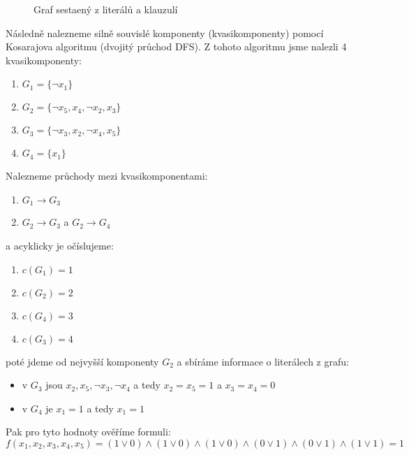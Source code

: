 \documentclass[10pt, a4paper]{ReportSheet}
\begin{document}
\begin{uloha}{12}{2}
\begin{figure}[H]
\begin{tikzpicture}[->,>=stealth',shorten >=1pt,auto,node distance=5cm,semithick]
            \end{tikzpicture}
            \caption{Graf sestaený z literálů a klauzulí}
            \label{fig:ukol-2-12-graf}
        \end{figure}

        Následně nalezneme silně souvislé komponenty (kvasikomponenty) pomocí Kosarajova algoritmu (dvojitý průchod DFS). Z tohoto algoritmu jsme nalezli 4 kvasikomponenty:
        \begin{enumerate}
            \item $G_1 = \{ \neg x_1 \}$
            \item $G_2 = \{ \neg x_5, x_4, \neg x_2, x_3 \}$
            \item $G_3 = \{ \neg x_3, x_2, \neg x_4, x_5 \}$
            \item $G_4 = \{ x_1 \}$
        \end{enumerate}

        Nalezneme průchody mezi kvasikomponentami:
        \begin{enumerate}
            \item $G_1 \rightarrow G_3$
            \item $G_2 \rightarrow G_3$ a $G_2 \rightarrow G_4$
        \end{enumerate}
        a acyklicky je očíslujeme:
        \begin{enumerate}
            \item $c(G_1) = 1$
            \item $c(G_2) = 2$
            \item $c(G_4) = 3$
            \item $c(G_3) = 4$
        \end{enumerate}
        poté jdeme od nejvyšší komponenty $G_2$ a sbíráme informace o literálech z grafu:
        \begin{itemize}
            \item v $G_3$ jsou $x_2, x_5, \neg x_3, \neg x_4$ a tedy $x_2 = x_5 = 1$ a $x_3 = x_4 = 0$
            \item v $G_4$ je $x_1 = 1$ a tedy $x_1 = 1$
        \end{itemize}

        Pak pro tyto hodnoty ověříme formuli:
        \begin{equation*}
            f(x_1, x_2, x_3, x_4, x_5) = (1 \lor 0) \land (1 \lor 0) \land
            (1 \lor 0) \land (0 \lor 1) \land (0 \lor 1) \land (1 \lor 1) = 1
        \end{equation*}


\end{uloha}
\end{document}
